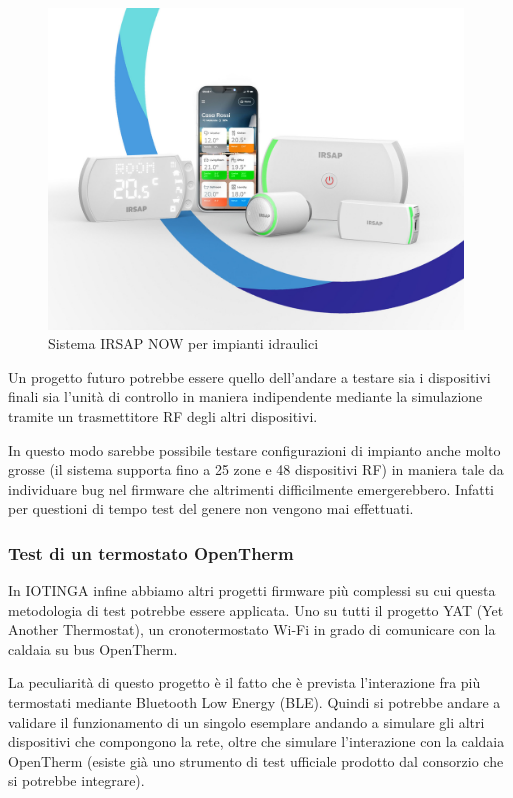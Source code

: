 \documentclass[a4paper,titlepage]{article}
\begin{document}
\begin{figure}[h]
    \centering
    \includegraphics[width=11cm]{img/now.jpeg}
    \caption{Sistema IRSAP NOW per impianti idraulici}
    \label{dispositivi_now}
\end{figure}

Un progetto futuro potrebbe essere quello dell'andare a testare sia i dispositivi finali
sia l'unità di controllo in maniera indipendente mediante la simulazione tramite
un trasmettitore RF degli altri dispositivi.

In questo modo sarebbe possibile testare configurazioni di impianto anche molto
grosse (il sistema supporta fino a 25 zone e 48 dispositivi RF) in maniera tale da
individuare bug nel firmware che altrimenti difficilmente emergerebbero. Infatti per
questioni di tempo test del genere non vengono mai effettuati.

\subsubsection{Test di un termostato OpenTherm}

In IOTINGA infine abbiamo altri progetti firmware più complessi su cui questa metodologia
di test potrebbe essere applicata. Uno su tutti il progetto YAT (Yet Another Thermostat),
un cronotermostato Wi-Fi in grado di comunicare con la caldaia su bus OpenTherm.

La peculiarità di questo progetto è il fatto che è prevista l'interazione fra più
termostati mediante Bluetooth Low Energy (BLE). Quindi si potrebbe andare a validare
il funzionamento di un singolo esemplare andando a simulare gli altri dispositivi
che compongono la rete, oltre che simulare l'interazione con la caldaia OpenTherm
(esiste già uno strumento di test ufficiale prodotto dal consorzio che si potrebbe
integrare).
\end{document}
